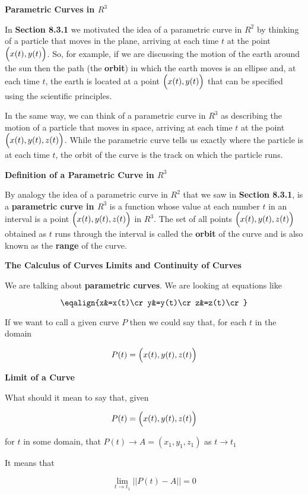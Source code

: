 {\bf Parametric Curves in $R^3$}

\vskip 1mm
In {\bf Section 8.3.1} we motivated the idea of a parametric curve in $R^2$ by thinking of a particle that moves in the plane, arriving at each time $t$ at the point $\Bigl(x(t),y(t)\Bigr)$. So, for example, if we are discussing the motion of the earth around the sun then the path (the {\bf orbit}) in which the earth moves is an ellipse and, at each time $t$, the earth is located at a point $\Bigl(x(t),y(t)\Bigr)$ that can be specified using the scientific principles.

\vskip 1mm
In the same way, we can think of a parametric curve in $R^3$ as describing the motion of a particle that moves in space, arriving at each time $t$ at the point $\Bigl(x(t),y(t),z(t)\Bigr)$. While the parametric curve tells us exactly where the particle is at each time $t$, the orbit of the curve is the track on which the particle runs.

\filbreak
\vskip 1cm
{\bf Definition of a Parametric Curve in $R^3$}

\vskip 1mm
By analogy the idea of a parametric curve in $R^2$ that we saw in {\bf Section 8.3.1}, is a {\bf parametric curve in $R^3$} is a function whose value at each number $t$ in an interval is a point $\Bigl(x(t),y(t),z(t)\Bigr)$ in $R^3$. The set of all points $\Bigl(x(t),y(t),z(t)\Bigr)$ obtained as $t$ runs through the interval is called the {\bf orbit} of the curve and is also known as the {\bf range} of the curve.

\filbreak
\vskip 1cm
{\bf The Calculus of Curves}
\vskip 1mm
{\bf Limits and Continuity of Curves}

\vskip 1mm
We are talking about {\bf parametric curves}. We are looking at equations like

$$\eqalign{x&=x(t)\cr
		y&=y(t)\cr
		z&=z(t)\cr}$$

If we want to call a given curve $P$ then we could say that, for each $t$ in the domain

$$P(t)=\Bigl(x(t),y(t),z(t)\Bigr)$$

\filbreak
\vskip 1cm
{\bf Limit of a Curve}

\vskip 1mm
What should it mean to say that, given

$$P(t)=\Bigl(x(t),y(t),z(t)\Bigr)$$

for $t$ in some domain, that $P(t)\to A=(x_1,y_1,z_1)$ as $t\to t_1$

\vskip 1mm
It means that

$$\lim_{t\to t_1}||P(t)-A||=0$$

